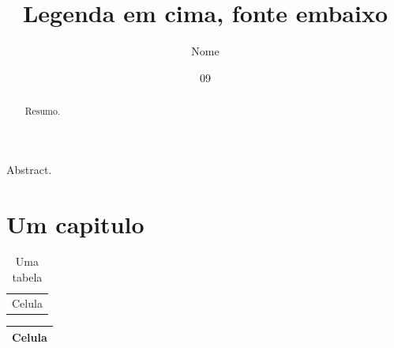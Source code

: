 \documentclass[dsc]{ufrj}
\title{Legenda em cima, fonte embaixo}
\author{Nome}{Sobrenome}
\date{09}{2026}
\begin{document}
  \maketitle
  \frontmatter
  \begin{abstract}Resumo.\end{abstract}
  \begin{foreignabstract}Abstract.\end{foreignabstract}
  \tableofcontents
  \mainmatter
  \chapter{Um capitulo}
  \begin{table}[htb]
    \caption{Uma tabela}
    \centering
    \begin{tabular}{c} Celula \end{tabular}
  \end{table}
  \begin{quadro}[htb]
    \caption{Um quadro}
    \centering
    \begin{tabular}{|c|} \hline Celula \\ \hline \end{tabular}
  \end{quadro}
\end{document}
